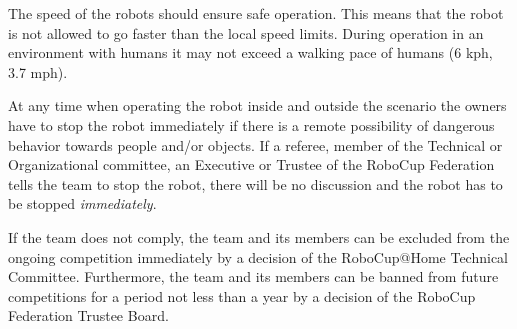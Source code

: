The speed of the robots should ensure safe operation. This means that the robot is not allowed to go faster than the local speed limits. During operation in an environment with humans it may not exceed a walking pace of humans (6 kph, 3.7 mph). 

At any time when operating the robot inside and outside the scenario the owners have to stop the robot immediately if there is a remote possibility of dangerous behavior towards people and/or objects. If a referee, member of the Technical or Organizational committee, an Executive or Trustee of the RoboCup Federation tells the team to stop the robot, there will be no discussion and the robot has to be stopped \emph{immediately}.

If the team does not comply, the team and its members can be excluded from the ongoing competition immediately by a decision of the RoboCup@Home Technical Committee. Furthermore, the team and its members can be banned from future competitions for a period not less than a year by a decision of the RoboCup Federation Trustee Board.

